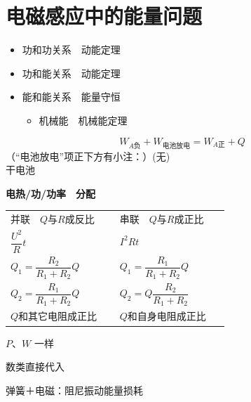 \section{电磁感应中的能量问题}
\begin{itemize}
  \item 功和功关系　动能定理
  \item 功和能关系　动能定理
  \item 能和能关系　能量守恒
  \begin{itemize}
    \item 机械能　机械能定理
  \end{itemize}
\end{itemize}

\[
W_{A\text{负}}+W_{\text{电池放电}}=W_{A\text{正}}+Q
\]
（“电池放电”项正下方有小注：）(无)\\
干电池

\textbf{电热/功/功率　分配}
\begin{center}
\begin{tabular}{p{0.44\linewidth}p{0.44\linewidth}}
并联　$Q$与$R$成反比 & 串联　$Q$与$R$成正比\\[2pt]
$\dfrac{U^2}{R}t$ & $I^2Rt$\\[6pt]
$Q_1=\dfrac{R_2}{R_1+R_2}Q$ & $Q_1=\dfrac{R_1}{R_1+R_2}Q$\\[8pt]
$Q_2=\dfrac{R_1}{R_1+R_2}Q$ & $Q_2=Q\dfrac{R_2}{R_1+R_2}$\\[8pt]
$Q$和其它电阻成正比 & $Q$和自身电阻成正比
\end{tabular}
\end{center}
$P$、$W$ 一样

数类直接代入

弹簧＋电磁：阻尼振动\quad 能量损耗

